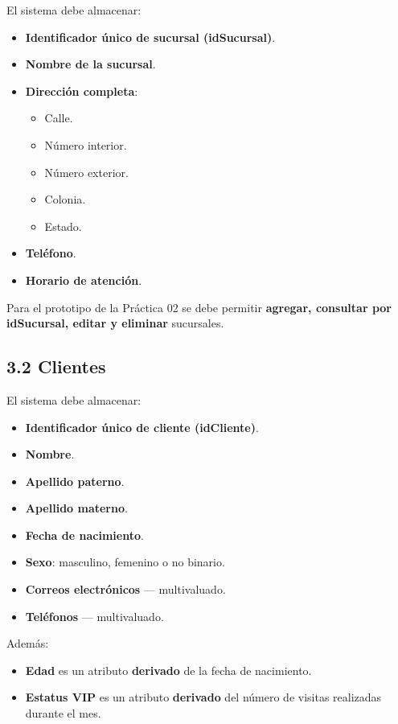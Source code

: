 \documentclass[12pt,a4paper]{article}
\begin{document}
El sistema debe almacenar:

\begin{itemize}
    \item \textbf{Identificador único de sucursal (idSucursal)}.
    \item \textbf{Nombre de la sucursal}.
    \item \textbf{Dirección completa}:
    \begin{itemize}
        \item Calle.
        \item Número interior.
        \item Número exterior.
        \item Colonia.
        \item Estado.
    \end{itemize}
    \item \textbf{Teléfono}.
    \item \textbf{Horario de atención}.
\end{itemize}

Para el prototipo de la Práctica 02 se debe permitir \textbf{agregar, consultar por idSucursal, editar y eliminar} sucursales.

\subsection*{3.2 Clientes}

El sistema debe almacenar:

\begin{itemize}
    \item \textbf{Identificador único de cliente (idCliente)}.
    \item \textbf{Nombre}.
    \item \textbf{Apellido paterno}.
    \item \textbf{Apellido materno}.
    \item \textbf{Fecha de nacimiento}.
    \item \textbf{Sexo}: masculino, femenino o no binario.
    \item \textbf{Correos electrónicos} --- multivaluado.
    \item \textbf{Teléfonos} --- multivaluado.
\end{itemize}

Además:

\begin{itemize}
    \item \textbf{Edad} es un atributo \textbf{derivado} de la fecha de nacimiento.
    \item \textbf{Estatus VIP} es un atributo \textbf{derivado} del número de visitas realizadas durante el mes.
\end{itemize}
\end{document}
